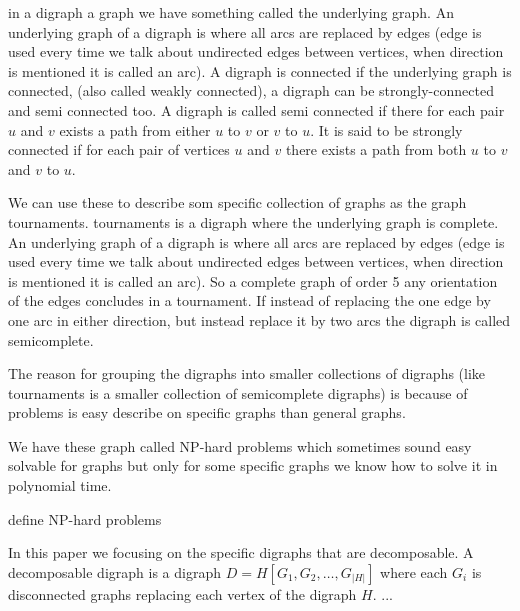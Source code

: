 in a digraph a graph we have something called the underlying graph. 
An underlying graph of a digraph is where all arcs are replaced by edges (edge is used every time we talk about undirected edges between vertices, when direction is mentioned it is called an arc).
A digraph is connected if the underlying graph is connected, (also called weakly connected), a digraph can be strongly-connected and semi connected too.
A digraph is called semi connected if there for each pair $u$ and $v$ exists a path from either $u$ to $v$ or $v$ to $u$. 
It is said to be strongly connected if for each pair of vertices $u$ and $v$ there exists a path from both $u$ to $v$ and $v$ to $u$.

We can use these to describe som specific collection of graphs as the graph tournaments.
tournaments is a digraph where the underlying graph is complete. 
An underlying graph of a digraph is where all arcs are replaced by edges (edge is used every time we talk about undirected edges between vertices, when direction is mentioned it is called an arc).
So a complete graph of order 5 any orientation of the edges concludes in a tournament.
If instead of replacing the one edge by one arc in either direction, but instead replace it by two arcs the digraph is called semicomplete.

The reason for grouping the digraphs into smaller collections of digraphs (like tournaments is a smaller collection of semicomplete digraphs) is because of problems is easy describe on specific graphs than general graphs.

We have these graph called NP-hard problems which sometimes sound easy solvable for graphs but only for some specific graphs we know how to solve it in polynomial time. 
\begin{definition}
    define NP-hard problems
\end{definition}

In this paper we focusing on the specific digraphs that are decomposable. 
A decomposable digraph is a digraph $D=H[G_1,G_2,\dots,G_|H|]$ where each $G_i$ is disconnected graphs replacing each vertex of the digraph $H$. ...

